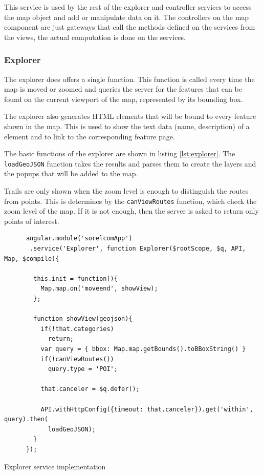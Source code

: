 This service is used by the rest of the explorer and controller services to access the map object and add or manipulate data on it. The controllers on the map component are just gateways that call the methods defined on the services from the views, the actual computation is done on the services. 

\subsubsection*{Explorer}

The explorer does offers a single function. This function is called every time the map is moved or zoomed and queries the server for the features that can be found on the current viewport of the map, represented by its bounding box.

The explorer also generates HTML elements that will be bound to every feature shown in the map. This is used to show the text data (name, description) of a element and to link to the corresponding feature page.

The basic functions of the explorer are shown in listing \ref{lst:explorer}. The \texttt{loadGeoJSON} function takes the results and parses them to create the layers and the popups that will be added to the map.

Trails are only shown when the zoom level is enough to distinguish the routes from points. This is determines by the \texttt{canViewRoutes} function, which check the zoom level of the map. If it is not enough, then the server is asked to return only points of interest.

\begin{listing}[ht]\centering
  \begin{minipage}{.85\textwidth}
    \begin{verbatim}
      angular.module('sorelcomApp')
       .service('Explorer', function Explorer($rootScope, $q, API, Map, $compile){
    
        this.init = function(){
          Map.map.on('moveend', showView);
        };
    
        function showView(geojson){
          if(!that.categories)
            return;
          var query = { bbox: Map.map.getBounds().toBBoxString() }
          if(!canViewRoutes())
            query.type = 'POI';
     
          that.canceler = $q.defer();
     
          API.withHttpConfig({timeout: that.canceler}).get('within', query).then(
            loadGeoJSON);
        }
      });
    \end{verbatim}
  \end{minipage}
  \caption{Explorer service implementation}\label{lst:explorer}
\end{listing}

